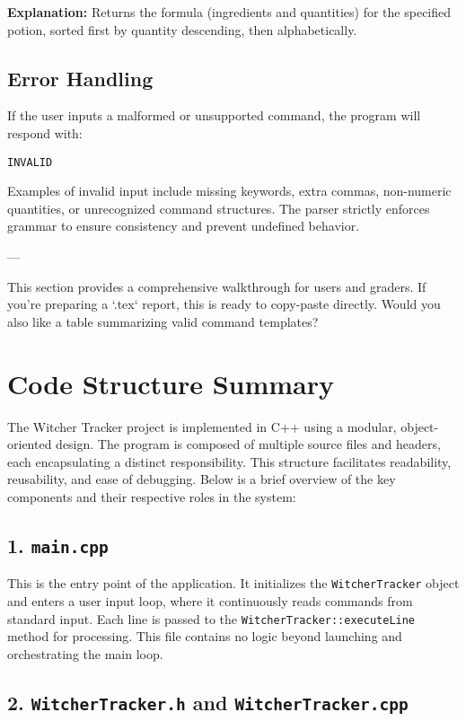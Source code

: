 \documentclass{article}
\begin{document}
\textbf{Explanation:} Returns the formula (ingredients and quantities) for the specified potion, sorted first by quantity descending, then alphabetically.

\subsection*{Error Handling}

If the user inputs a malformed or unsupported command, the program will respond with:

\begin{lstlisting}
INVALID
\end{lstlisting}

Examples of invalid input include missing keywords, extra commas, non-numeric quantities, or unrecognized command structures. The parser strictly enforces grammar to ensure consistency and prevent undefined behavior.

---

This section provides a comprehensive walkthrough for users and graders. If you're preparing a `.tex` report, this is ready to copy-paste directly. Would you also like a table summarizing valid command templates?

\section{Code Structure Summary}

The Witcher Tracker project is implemented in C++ using a modular, object-oriented design. The program is composed of multiple source files and headers, each encapsulating a distinct responsibility. This structure facilitates readability, reusability, and ease of debugging. Below is a brief overview of the key components and their respective roles in the system:

\subsection*{1. \texttt{main.cpp}}

This is the entry point of the application. It initializes the \texttt{WitcherTracker} object and enters a user input loop, where it continuously reads commands from standard input. Each line is passed to the \texttt{WitcherTracker::executeLine} method for processing. This file contains no logic beyond launching and orchestrating the main loop.

\subsection*{2. \texttt{WitcherTracker.h} and \texttt{WitcherTracker.cpp}}
\end{document}
